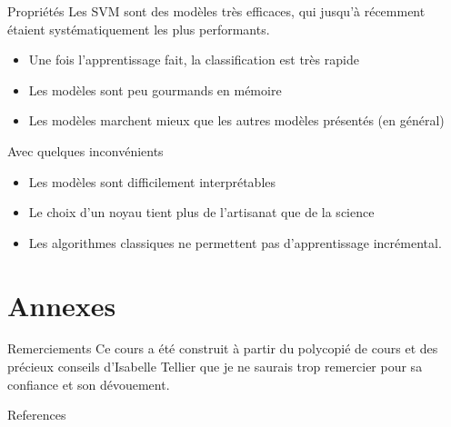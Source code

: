 \documentclass[hyperref={unicode}, xcolor={svgnames}, french]{beamer}
\begin{document}
\begin{frame}{Propriétés}
    Les SVM sont des modèles très efficaces, qui jusqu'à récemment étaient systématiquement les plus performants.
    \begin{itemize}
        \item Une fois l'apprentissage fait, la classification est très rapide
        \item Les modèles sont peu gourmands en mémoire
        \item Les modèles marchent mieux que les autres modèles présentés (en général)
    \end{itemize}
    Avec quelques inconvénients
    \begin{itemize}
        \item Les modèles sont difficilement interprétables
        \item Le choix d'un noyau tient plus de l'artisanat que de la science
        \item Les algorithmes classiques ne permettent pas d'apprentissage incrémental.
    \end{itemize}
\end{frame}


\appendix
{}  %
\section{Annexes}
\begin{frame}{Remerciements}
    Ce cours a été construit à partir du polycopié de cours  \parencite{tellier2017IntroductionFouilleTextes} et des précieux conseils d'Isabelle Tellier que je ne saurais trop remercier pour sa confiance et son dévouement.
\end{frame}

\begin{frame}[allowframebreaks]{References}
    \printbibliography[heading=none]
\end{frame}
\end{document}

